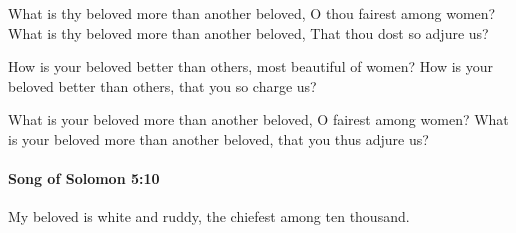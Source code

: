 			\begin{versebox}
					\item[BHS] 
					\item[LXX] 
					\item[ASV] What is thy beloved more than another beloved, O thou fairest among women? What is thy beloved more than another beloved, That thou dost so adjure us?
					\item[NIV] How is your beloved better than others, most beautiful of women? How is your beloved better than others, that you so charge us?
					\item[NRSV] What is your beloved more than another beloved, O fairest among women? What is your beloved more than another beloved, that you thus adjure us?
			\end{versebox}

		\paragraph{Song of Solomon 5:10} %
			\label{SONGOFSOLOMON-5-10}

			My beloved is white and ruddy, the chiefest among ten thousand.

